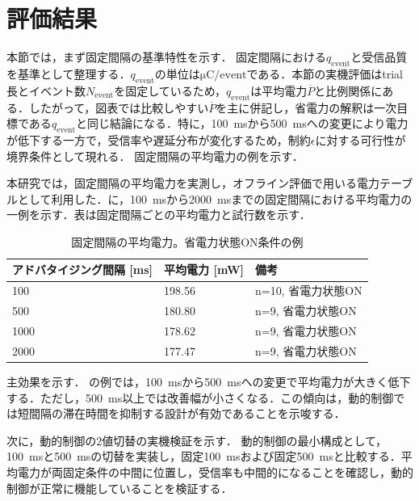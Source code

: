 \section{評価結果}
\label{sec:evaluation_results}

本節では，まず固定間隔の基準特性を示す．
固定間隔における$q_{\mathrm{event}}$と受信品質を基準として整理する．$q_{\mathrm{event}}$の単位は$\si{\micro\coulomb}/\text{event}$である．本節の実機評価はtrial長とイベント数$N_{\mathrm{event}}$を固定しているため，$q_{\mathrm{event}}$は平均電力$\overline{P}$と比例関係にある．したがって，図表では比較しやすい$\overline{P}$を主に併記し，省電力の解釈は一次目標である$q_{\mathrm{event}}$と同じ結論になる．特に，\SI{100}{\milli\second}から\SI{500}{\milli\second}への変更により電力が低下する一方で，受信率や遅延分布が変化するため，制約$\epsilon$に対する可行性が境界条件として現れる．
固定間隔の平均電力の例を示す．

本研究では，固定間隔の平均電力を実測し，オフライン評価で用いる電力テーブルとして利用した．に，\SI{100}{\milli\second}から\SI{2000}{\milli\second}までの固定間隔における平均電力の一例を示す．表は固定間隔ごとの平均電力と試行数を示す．

\begin{table}[tb]
  \centering
\caption{固定間隔の平均電力。省電力状態ON条件の例}
  \label{tab:power_table_example}
  \begin{tabular}{lll}
    \toprule
    アドバタイジング間隔 [ms] & 平均電力 [mW] & 備考 \\
    \midrule
    100  & 198.56 & n=10, 省電力状態ON \\
    500  & 180.80 & n=9, 省電力状態ON \\
    1000 & 178.62 & n=9, 省電力状態ON \\
    2000 & 177.47 & n=9, 省電力状態ON \\
    \bottomrule
  \end{tabular}
\end{table}
主効果を示す．
の例では，\SI{100}{\milli\second}から\SI{500}{\milli\second}への変更で平均電力が大きく低下する．ただし，\SI{500}{\milli\second}以上では改善幅が小さくなる．この傾向は，動的制御では短間隔の滞在時間を抑制する設計が有効であることを示唆する．

次に，動的制御の2値切替の実機検証を示す．
動的制御の最小構成として，\SI{100}{\milli\second}と\SI{500}{\milli\second}の切替を実装し，固定\SI{100}{\milli\second}および固定\SI{500}{\milli\second}と比較する．平均電力が両固定条件の中間に位置し，受信率も中間的になることを確認し，動的制御が正常に機能していることを検証する．

